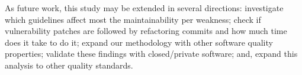 \documentclass[10pt,conference]{IEEEtran}
\begin{document}
As future work, this study may be extended in several directions: 
investigate which guidelines affect most the maintainability per
weakness; check if vulnerability patches are followed by refactoring
commits and how much time does it take to do it; 
expand our methodology with other software quality properties; 
validate these findings with closed/private
software; and, expand this analysis to other quality standards.

%
%
\balance

{
  
  
}
\end{document}
